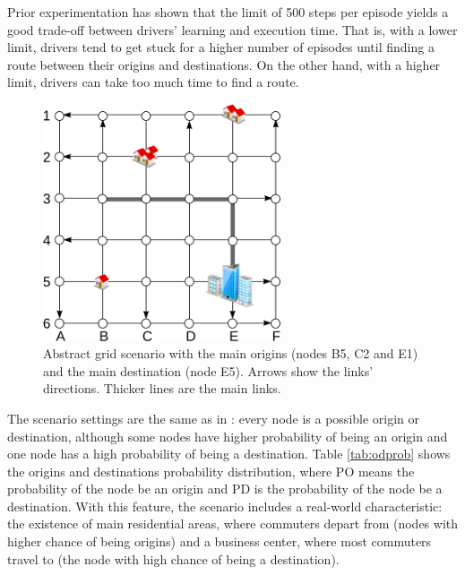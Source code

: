 \documentclass{RITA}
\begin{document}
Prior experimentation has shown that the limit of 500 steps per episode yields a good trade-off between drivers' learning and execution time. That is, with a lower limit, drivers tend to get stuck for a higher number of episodes until finding a route between their origins and destinations. On the other hand, with a higher limit, drivers can take too much time to find a route.

\begin{figure}[ht]
    \centerline{\includegraphics[width=7cm]{img/6x6grid.png}}
    \caption{Abstract grid scenario with the main origins (nodes B5, C2 and E1) and the main destination (node E5). Arrows show the links' directions. Thicker lines are the main links.}
    \label{fig:6x6grid}
\end{figure} 

The scenario settings are the same as in \cite{Bazzan+2008alamas}: every node is a possible origin or destination, although some nodes have higher probability of being an origin and one node has a high probability of being a destination. Table \ref{tab:odprob} shows the origins and destinations probability distribution, where PO means the probability of the node be an origin and PD is the probability of the node be a destination. With this feature, the scenario includes a real-world characteristic: the existence of main residential areas, where commuters depart from (nodes with higher chance of being origins) and a business center, where most commuters travel to (the node with high chance of being a destination).
\end{document}
